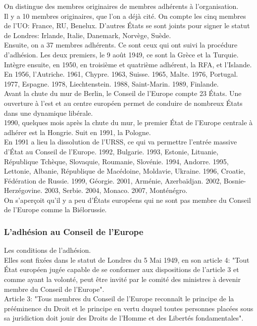 \documentclass[10pt, a4paper, openany]{book}
\begin{document}
On distingue des membres originaires de membres adhérents à l'organisation. \\
Il y a 10 membres originaires, que l'on a déjà cité. On compte les cinq membres de l'UO:  France, RU, Benelux. D'autres États se sont joints pour signer le statut de Londres: Irlande, Italie, Danemark, Norvège, Suède. \\
Ensuite, on a 37 membres adhérents. Ce sont ceux qui ont suivi la procédure d'adhésion. Les deux premiers, le 9 août 1949, ce sont la Grèce et la Turquie. Intègre ensuite, en 1950, en troisième et quatrième adhérent, la RFA, et l'Islande. En 1956, l'Autriche. 1961, Chypre. 1963, Suisse. 1965, Malte. 1976, Portugal. 1977, Espagne. 1978, Liechtenstein. 1988, Saint-Marin. 1989, Finlande. \\
Avant la chute du mur de Berlin, le Conseil de l'Europe compte 23 États. Une ouverture à l'est et au centre européen permet de conduire de nombreux États dans une dynamique libérale. \\
1990, quelques mois après la chute du mur, le premier État de l'Europe centrale à adhérer est la Hongrie. Suit en 1991, la Pologne. \\
En 1991 a lieu la dissolution de l'URSS, ce qui va permettre l'entrée massive d'État au Conseil de l'Europe. 1992, Bulgarie. 1993, Estonie, Lituanie, République Tchèque, Slovaquie, Roumanie, Slovénie. 1994, Andorre. 1995, Lettonie, Albanie, République de Macédoine, Moldavie, Ukraine. 1996, Croatie, Fédération de Russie. 1999, Géorgie. 2001, Arménie, Azerbaïdjan. 2002, Bosnie-Herzégovine. 2003, Serbie. 2004, Monaco. 2007, Monténégro.  \\
On s'aperçoit qu'il y a peu d'États européens qui ne sont pas membre du Conseil de l'Europe comme la Biélorussie.

\subsubsection{L'adhésion au Conseil de l'Europe}

Les conditions de l'adhésion. \\
Elles sont fixées dans le statut de Londres du 5 Mai 1949, en son article 4: "Tout État européen jugée capable de se conformer aux dispositions de l'article 3 et comme ayant la volonté, peut être invité par le comité des ministres à devenir membre du Conseil de l'Europe". \\
Article 3: "Tous membres du Conseil de l'Europe reconnaît le principe de la prééminence du Droit et le principe en vertu duquel toutes personnes placées sous sa juridiction doit jouir des Droits de l'Homme et des Libertés fondamentales".
\end{document}

